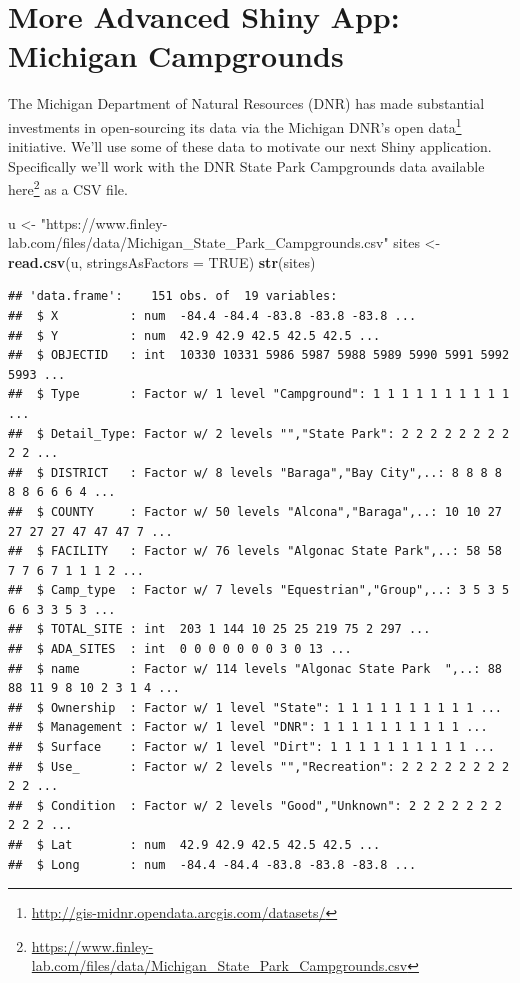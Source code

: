 \documentclass[
]{krantz}
\newenvironment{Shaded}{\begin{snugshade}}{\end{snugshade}}
\newcommand{\DataTypeTok}[1]{\textcolor[rgb]{0.13,0.29,0.53}{#1}}
\newcommand{\KeywordTok}[1]{\textcolor[rgb]{0.13,0.29,0.53}{\textbf{#1}}}
\newcommand{\NormalTok}[1]{#1}
\newcommand{\OtherTok}[1]{\textcolor[rgb]{0.56,0.35,0.01}{#1}}
\newcommand{\StringTok}[1]{\textcolor[rgb]{0.31,0.60,0.02}{#1}}
\renewcommand{\href}[2]{#2\footnote{\url{#1}}}
\begin{document}
\hypertarget{more-advanced-shiny-app-michigan-campgrounds}{%
\section{More Advanced Shiny App: Michigan Campgrounds}\label{more-advanced-shiny-app-michigan-campgrounds}}

The Michigan Department of Natural Resources (DNR) has made substantial investments in open-sourcing its data via the \href{http://gis-midnr.opendata.arcgis.com/datasets/}{Michigan DNR's open data} initiative. We'll use some of these data to motivate our next Shiny application. Specifically we'll work with the DNR State Park Campgrounds data available \href{https://www.finley-lab.com/files/data/Michigan_State_Park_Campgrounds.csv}{here} as a CSV file.

\begin{Shaded}
\begin{Highlighting}[]
\NormalTok{u \textless{}{-}}\StringTok{ "https://www.finley{-}lab.com/files/data/Michigan\_State\_Park\_Campgrounds.csv"}
\NormalTok{sites \textless{}{-}}\StringTok{ }\KeywordTok{read.csv}\NormalTok{(u, }\DataTypeTok{stringsAsFactors =} \OtherTok{TRUE}\NormalTok{)}
\KeywordTok{str}\NormalTok{(sites)}
\end{Highlighting}
\end{Shaded}

\begin{verbatim}
## 'data.frame':    151 obs. of  19 variables:
##  $ X          : num  -84.4 -84.4 -83.8 -83.8 -83.8 ...
##  $ Y          : num  42.9 42.9 42.5 42.5 42.5 ...
##  $ OBJECTID   : int  10330 10331 5986 5987 5988 5989 5990 5991 5992 5993 ...
##  $ Type       : Factor w/ 1 level "Campground": 1 1 1 1 1 1 1 1 1 1 ...
##  $ Detail_Type: Factor w/ 2 levels "","State Park": 2 2 2 2 2 2 2 2 2 2 ...
##  $ DISTRICT   : Factor w/ 8 levels "Baraga","Bay City",..: 8 8 8 8 8 8 6 6 6 4 ...
##  $ COUNTY     : Factor w/ 50 levels "Alcona","Baraga",..: 10 10 27 27 27 27 47 47 47 7 ...
##  $ FACILITY   : Factor w/ 76 levels "Algonac State Park",..: 58 58 7 7 6 7 1 1 1 2 ...
##  $ Camp_type  : Factor w/ 7 levels "Equestrian","Group",..: 3 5 3 5 6 6 3 3 5 3 ...
##  $ TOTAL_SITE : int  203 1 144 10 25 25 219 75 2 297 ...
##  $ ADA_SITES  : int  0 0 0 0 0 0 0 3 0 13 ...
##  $ name       : Factor w/ 114 levels "Algonac State Park  ",..: 88 88 11 9 8 10 2 3 1 4 ...
##  $ Ownership  : Factor w/ 1 level "State": 1 1 1 1 1 1 1 1 1 1 ...
##  $ Management : Factor w/ 1 level "DNR": 1 1 1 1 1 1 1 1 1 1 ...
##  $ Surface    : Factor w/ 1 level "Dirt": 1 1 1 1 1 1 1 1 1 1 ...
##  $ Use_       : Factor w/ 2 levels "","Recreation": 2 2 2 2 2 2 2 2 2 2 ...
##  $ Condition  : Factor w/ 2 levels "Good","Unknown": 2 2 2 2 2 2 2 2 2 2 ...
##  $ Lat        : num  42.9 42.9 42.5 42.5 42.5 ...
##  $ Long       : num  -84.4 -84.4 -83.8 -83.8 -83.8 ...
\end{verbatim}
\end{document}
